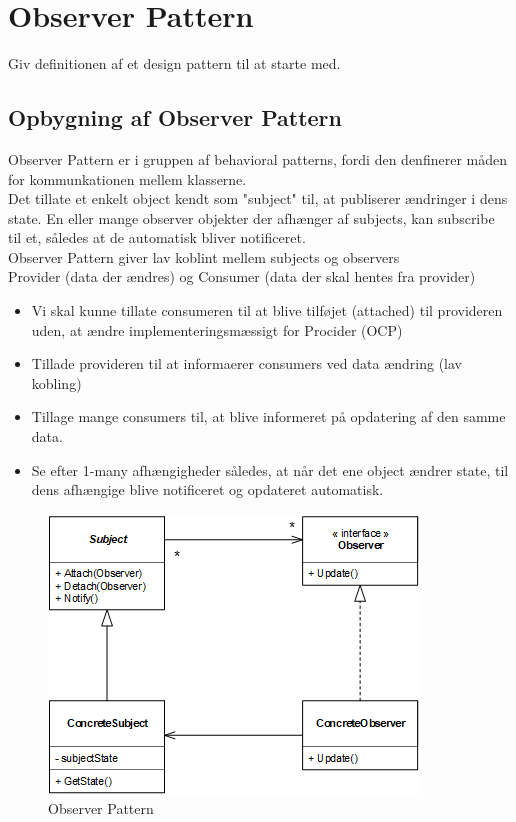 \documentclass[../report.tex]{subfiles}
\begin{document}
\section{Observer Pattern}

Giv definitionen af et design pattern til at starte med.

\subsection{Opbygning af Observer Pattern}
Observer Pattern er i gruppen af behavioral patterns, fordi den denfinerer måden for kommunkationen mellem klasserne.
\\

Det tillate et enkelt object kendt som "subject" til, at publiserer ændringer i dens state. En eller mange observer objekter der afhænger af subjects, kan subscribe til et, således at de automatisk bliver notificeret.
\\

Observer Pattern giver lav koblint mellem subjects og observers
\\

Provider (data der ændres) og Consumer (data der skal hentes fra provider)
\begin{itemize}
    \item Vi skal kunne tillate consumeren til at blive tilføjet (attached) til provideren uden, at ændre implementeringsmæssigt for Procider (OCP)
    \item Tillade provideren til at informaerer consumers ved data ændring (lav kobling)
    \item Tillage mange consumers til, at blive informeret på opdatering af den samme data.
    \item Se efter 1-many afhængigheder således, at når det ene object ændrer state, til dens afhængige blive notificeret og opdateret automatisk.
\end{itemize}

\begin{figure}[H]
    \centering
    \includegraphics{pics/observer_pattern.PNG}
    \caption{Observer Pattern}
    \label{fig:observer_pattern}
\end{figure}
\end{document}
